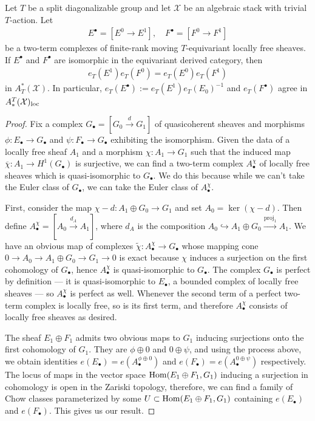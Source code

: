 \begin{lemma}\label{rl-000U}\label{lem:euler-class-well-defined}
  Let \(T\) be a split diagonalizable group and let \(\mathcal X\) be an algebraic stack with trivial \(T\)-action. Let
  \begin{align*}
    E^\bullet = [E^0 \to E^1], \hspace{1em} F^\bullet = [F^0 \to F^1]
  \end{align*}
  be a two-term complexes of finite-rank moving \(T\)-equivariant locally free sheaves. If \(E^\bullet\) and \(F^\bullet\) are isomorphic in the equivariant derived category, then
  \begin{align*}
    e_T(E^1)e_T(F^0) = e_T(E^0)e_T(F^1)
  \end{align*}
  in \(A^*_T(\mathcal X)\). In particular, \(e_T(E^\bullet) := e_T(E^1)e_T(E_0)^{-1}\) and \(e_T(F^\bullet)\) agree in \(A_*^T(\mathcal X)_{\operatorname{loc}}\)
\end{lemma}

\begin{proof}
  Fix a complex \(G_\bullet = [G_0 \xrightarrow{d} G_1]\) of quasicoherent sheaves and morphisms \(\phi:E_\bullet \to G_\bullet\) and \(\psi:F_\bullet\to G_\bullet\) exhibiting the isomorphism. Given the data of a locally free sheaf \(A_1\) and a morphism \(\chi:A_1\to G_1\) such that the induced map \(\overline \chi: A_1 \to H^1(G_\bullet)\) is surjective, we can find a two-term complex \(A^\chi_\bullet\) of locally free sheaves which is quasi-isomorphic to \(G_\bullet\). We do this because while we can't take the Euler class of \(G_\bullet\), we can take the Euler class of \(A_\bullet^\chi\).

  First, consider the map \(\chi - d: A_1\oplus G_0 \to G_1\) and set \(A_0 = \ker (\chi - d)\). Then define \(A^\chi_\bullet = [A_0 \xrightarrow{d_A} A_1]\), where \(d_A\) is the composition \(A_0 \hookrightarrow A_1\oplus G_0 \xrightarrow{\text{proj}_1} A_1\). We have an obvious map of complexes \(\tilde \chi: A^\chi_\bullet \to G_\bullet\) whose mapping cone \(0\to A_0 \to A_1\oplus G_0 \to G_1 \to 0\) is exact because \(\chi\) induces a surjection on the first cohomology of \(G_\bullet\), hence \(A^\chi_\bullet\) is quasi-isomorphic to \(G_\bullet\). The complex \(G_\bullet\) is perfect by definition --- it is quasi-isomorphic to \(E_\bullet\), a bounded complex of locally free sheaves --- so \(A^\chi_\bullet\) is perfect as well. Whenever the second term of a perfect two-term complex is locally free, so is its first term, and therefore \(A^\chi_\bullet\) consists of locally free sheaves as desired.

  The sheaf \(E_1\oplus F_1\) admits two obvious maps to \(G_1\) inducing surjections onto the first cohomology of \(G_1\). They are \(\phi\oplus 0\) and \(0\oplus \psi\), and using the process above, we obtain identities \(e(E_\bullet) = e(A^{\phi\oplus 0}_\bullet)\) and \(e(F_\bullet) = e(A^{0\oplus\psi}_\bullet)\) respectively. The locus of maps in the vector space \(\operatorname{Hom}(E_1\oplus F_1, G_1)\) inducing a surjection in cohomology is open in the Zariski topology, therefore, we can find a family of Chow classes parameterized by some \(U\subset \operatorname{Hom}(E_1\oplus F_1, G_1)\) containing \(e(E_\bullet)\) and \(e(F_\bullet)\). This gives us our result.
\end{proof}
